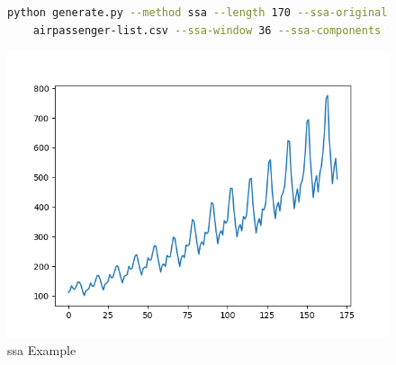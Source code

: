\begin{figure}
\begin{lstlisting}[language=bash]
    python generate.py --method ssa --length 170 --ssa-original \
    airpassenger-list.csv --ssa-window 36 --ssa-components 13 --display
\end{lstlisting}
\includegraphics[scale=0.7]{figures/ssa}
\caption{ssa Example}    
\label{fig:ssa-example}
\end{figure}